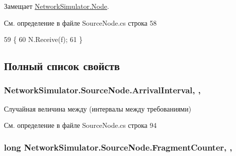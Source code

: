 Замещает \hyperlink{class_network_simulator_1_1_node_abcda5067b8842a447b2ad293818fc319}{Network\+Simulator.\+Node}.



См. определение в файле Source\+Node.\+cs строка 58


\begin{DoxyCode}
59         \{
60             N.Receive(f);
61         \}
\end{DoxyCode}


\subsection{Полный список свойств}
\subsubsection[{\texorpdfstring{Arrival\+Interval}{ArrivalInterval}}]{ Network\+Simulator.\+Source\+Node.\+Arrival\+Interval\hspace{0.3cm}{\ttfamily [get]}, {\ttfamily [set]}, {\ttfamily [protected]}}\hypertarget{class_network_simulator_1_1_source_node_a9da60399e7ba58e5eea72a57acf69b8e}{}\label{class_network_simulator_1_1_source_node_a9da60399e7ba58e5eea72a57acf69b8e}


Случайная величина между (интервалы между требованиями) 



См. определение в файле Source\+Node.\+cs строка 94

\subsubsection[{\texorpdfstring{Fragment\+Counter}{FragmentCounter}}]{\setlength{\rightskip}{0pt plus 5cm}long Network\+Simulator.\+Source\+Node.\+Fragment\+Counter\hspace{0.3cm}{\ttfamily [get]}, {\ttfamily [set]}, {\ttfamily [private]}}\hypertarget{class_network_simulator_1_1_source_node_afaf73f99d665080e19cc98941c24af31}{}\label{class_network_simulator_1_1_source_node_afaf73f99d665080e19cc98941c24af31}


